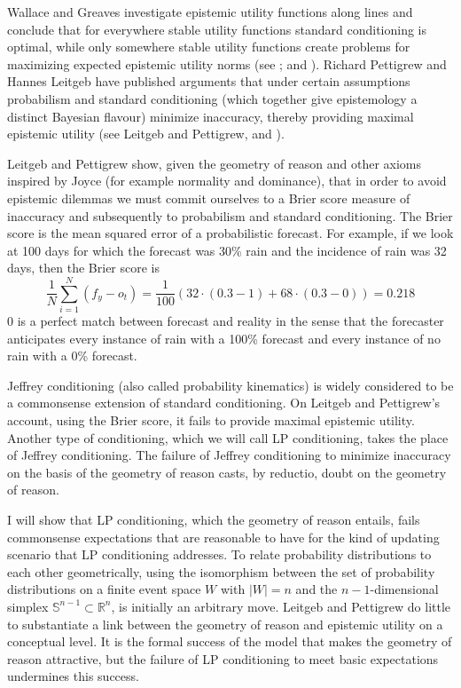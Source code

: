 \documentclass[phd,12pt,oneside]{ubcthesis}
\begin{document}
Wallace and Greaves investigate epistemic utility functions along
 lines and conclude that for everywhere stable
utility functions standard conditioning is optimal, while only
somewhere stable utility functions create problems for maximizing
expected epistemic utility norms (see ;
and ). Richard Pettigrew and Hannes Leitgeb
have published arguments that under certain assumptions probabilism
and standard conditioning (which together give epistemology a distinct
Bayesian flavour) minimize inaccuracy, thereby providing maximal
epistemic utility (see Leitgeb and Pettigrew,
 and
).

Leitgeb and Pettigrew show, given the geometry of reason and other
axioms inspired by Joyce (for example normality and dominance), that
in order to avoid epistemic dilemmas we must commit ourselves to a
Brier score measure of inaccuracy and subsequently to probabilism and
standard conditioning. The Brier score is the mean squared error of a
probabilistic forecast. For example, if we look at 100 days for which
the forecast was 30\% rain and the incidence of rain was 32 days, then
the Brier score is
\begin{equation}
  \label{eq:thahthoo}
  \frac{1}{N}\sum_{i=1}^{N}\left(f_{y}-o_{t}\right)=\frac{1}{100}\left(32\cdot{}(0.3-1)+68\cdot{}(0.3-0)\right)=0.218
\end{equation}
$0$ is a perfect match between forecast and reality in the sense that
the forecaster anticipates every instance of rain with a 100\%
forecast and every instance of no rain with a 0\% forecast.

Jeffrey conditioning (also called probability kinematics) is widely
considered to be a commonsense extension of standard conditioning. On
Leitgeb and Pettigrew's account, using the Brier score, it fails to
provide maximal epistemic utility. Another type of conditioning, which
we will call LP conditioning, takes the place of Jeffrey conditioning.
The failure of Jeffrey conditioning to minimize inaccuracy on the
basis of the geometry of reason casts, by reductio, doubt on the
geometry of reason.

I will show that LP conditioning, which the geometry of reason
entails, fails commonsense expectations that are reasonable to have
for the kind of updating scenario that LP conditioning addresses. To
relate probability distributions to each other geometrically, using
the isomorphism between the set of probability distributions on a
finite event space $W$ with $|W|=n$ and the $n-1$-dimensional simplex
$\mathbb{S}^{n-1}\subset\mathbb{R}^{n}$, is initially an arbitrary
move. Leitgeb and Pettigrew do little to substantiate a link between
the geometry of reason and epistemic utility on a conceptual level. It
is the formal success of the model that makes the geometry of reason
attractive, but the failure of LP conditioning to meet basic
expectations undermines this success.
\end{document}
